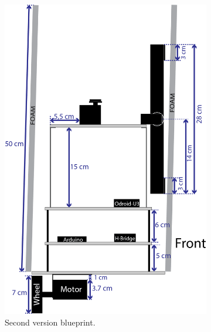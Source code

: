 \begin{figure}[h]
\begin{subfigure}[c]{0.3\textwidth}
	\includegraphics[width=\textwidth]{./Images/upperThirdD.png}
	\caption{Second version blueprint.}
	\label{fig:triskar-second-design}
	\end{subfigure}
	\\
	\begin{subfigure}[c]{0.3\textwidth}
	\centering

\end{subfigure}
\end{figure}
